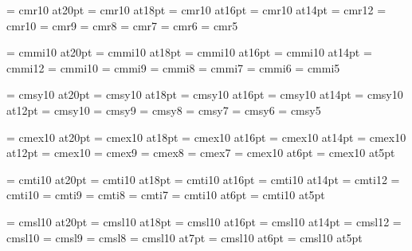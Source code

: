 

\font\twentyrm=     cmr10 at20pt
\font\eighteenrm=   cmr10 at18pt
\font\sixteenrm=    cmr10 at16pt
\font\fourteenrm=   cmr10 at14pt
\font\twelverm=     cmr12
\font\tenrm=        cmr10
\font\ninerm=       cmr9
\font\eightrm=      cmr8
\font\sevenrm=      cmr7
\font\sixrm=        cmr6
\font\fiverm=       cmr5

\font\twentyi=      cmmi10 at20pt
\font\eighteeni=    cmmi10 at18pt
\font\sixteeni=     cmmi10 at16pt
\font\fourteeni=    cmmi10 at14pt
\font\twelvei=      cmmi12
\font\teni=         cmmi10
\font\ninei=        cmmi9
\font\eighti=       cmmi8
\font\seveni=       cmmi7
\font\sixi=         cmmi6
\font\fivei=        cmmi5

\font\twentysy=     cmsy10 at20pt
\font\eighteensy=   cmsy10 at18pt
\font\sixteensy=    cmsy10 at16pt
\font\fourteensy=   cmsy10 at14pt
\font\twelvesy=     cmsy10 at12pt
\font\tensy=        cmsy10
\font\ninesy=       cmsy9
\font\eightsy=      cmsy8
\font\sevensy=      cmsy7
\font\sixsy=        cmsy6
\font\fivesy=       cmsy5

\font\twentyex=     cmex10 at20pt
\font\eighteenex=   cmex10 at18pt
\font\sixteenex=    cmex10 at16pt
\font\fourteenex=   cmex10 at14pt
\font\twelveex=     cmex10 at12pt
\font\tenex=        cmex10
\font\nineex=       cmex9
\font\eightex=      cmex8
\font\sevenex=      cmex7
\font\sixex=        cmex10 at6pt
\font\fiveex=       cmex10 at5pt

\font\twentyit=     cmti10 at20pt
\font\eighteenit=   cmti10 at18pt
\font\sixteenit=    cmti10 at16pt
\font\fourteenit=   cmti10 at14pt
\font\twelveit=     cmti12
\font\tenit=        cmti10
\font\nineit=       cmti9
\font\eightit=      cmti8
\font\sevenit=      cmti7
\font\sixit=        cmti10 at6pt
\font\fiveit=       cmti10 at5pt

\font\twentysl=     cmsl10 at20pt
\font\eighteensl=   cmsl10 at18pt
\font\sixteensl=    cmsl10 at16pt
\font\fourteensl=   cmsl10 at14pt
\font\twelvesl=     cmsl12
\font\tensl=        cmsl10
\font\ninesl=       cmsl9
\font\eightsl=      cmsl8
\font\sevensl=      cmsl10 at7pt
\font\sixsl=        cmsl10 at6pt
\font\fivesl=       cmsl10 at5pt

